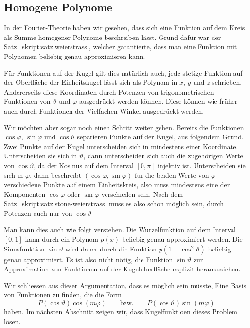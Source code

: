 \subsection{Homogene Polynome}
In der Fourier-Theorie haben wir gesehen, dass sich eine Funktion
auf dem Kreis als Summe homogener Polynome beschreiben lässt.
Grund dafür war der Satz~\ref{skript:satz:weierstrass}, welcher
garantierte, dass man eine Funktion mit Polynomen beliebig genau
approximieren kann.

Für Funktionen auf der Kugel gilt dies natürlich auch, jede stetige
Funktion auf der Oberfläche der Einheitskugel lässt sich als Polynom in
$x$, $y$ und $z$ schrieben.
Andererseits diese Koordinaten durch Potenzen von trigonometrischen
Funktionen von $\vartheta$ und $\varphi$ ausgedrückt werden können.
Diese können wie früher auch durch Funktionen der Vielfachen Winkel
ausgedrückt werden.

Wir möchten aber sogar noch einen Schritt weiter gehen.
Bereits die Funktionen $\cos\varphi$, $\sin\varphi$ und $\cos\vartheta$
separieren Punkte auf der Kugel, aus folgendem Grund.
Zwei Punkte auf der Kugel unterscheiden sich in mindestens einer 
Koordinate.
Unterscheiden sie sich in $\vartheta$, dann unterscheiden sich auch
die zugehörigen Werte von $\cos\vartheta$, da der Kosinus auf dem
Interval $[0,\pi]$ injektiv ist.
Unterscheiden sie sich in $\varphi$, dann beschreibt
$(\cos\varphi,\sin\varphi)$ für die beiden Werte von $\varphi$ verschiedene
Punkte auf einem Einheitskreis, also muss mindestens eine der
Komponenten $\cos\varphi$ oder $\sin\varphi$ verschieden sein.
Nach dem Satz~\ref{skript:satz:stone-weierstrass} muss es also schon
möglich sein, durch Potenzen auch nur von $\cos\vartheta$

Man kann dies auch wie folgt verstehen.
Die Wurzelfunktion auf dem Interval $[0,1]$ kann durch ein Polynom $p(x)$
beliebig genau approximiert werden.
Die Sinusfunktion $\sin\vartheta$ wird daher durch die Funktion
$p(1-\cos^2\vartheta)$ beliebig genau approximiert.
Es ist also nicht nötig, die Funktion $\sin\vartheta$ zur Approximation
von Funktionen auf der Kugeloberfläche explizit heranzuziehen.

Wir schliessen aus dieser Argumentation, dass es möglich sein müsste,
Eine Basis von Funktionen zu finden, die die Form
\[
P(\cos\vartheta) \cos(m\varphi)
\qquad
\text{bzw.}
\qquad
P(\cos\vartheta) \sin(m\varphi)
\]
haben.
Im nächsten Abschnitt zeigen wir, dass Kugelfunktioen dieses Problem lösen.



